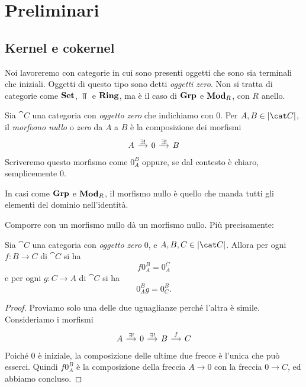 
\chapter{Preliminari}



\section{Kernel e cokernel}

Noi lavoreremo con categorie in cui sono presenti oggetti che sono sia
terminali che iniziali. Oggetti di questo tipo sono detti {\em oggetti
  zero}. Non si tratta di categorie come \(\mathbf{Set}\), \(\Top\) e \(\mathbf{Ring}\),
ma è il caso di \(\mathbf{Grp}\) e \(\mathbf{Mod}_R\), con \(R\) anello.

\begin{definition}
  Sia \(\cat C\) una categoria con {\em oggetto zero} che indichiamo con
  \(0\). Per \(A, B \in \obj{\cat C}\), il {\em morfismo nullo} o {\em
    zero} da \(A\) a \(B\) è la composizione dei morfismi
  \[
    \begin{tikzcd}[column sep=small]
      A \ar["{\exists!}", r] & 0 \ar["{\exists!}", r] & B
    \end{tikzcd}
  \]
  Scriveremo questo morfismo come \(0_A^B\) oppure, se dal contesto è
  chiaro, semplicemente \(0\).
\end{definition}

\begin{example}
  In casi come \(\mathbf{Grp}\) e \(\mathbf{Mod}_R\), il morfismo nullo è quello che
  manda tutti gli elementi del dominio nell'identità. %
\end{example}

Comporre con un morfismo nullo dà un morfismo nullo. Più precisamente:

\begin{proposition}\label{lemma:CompCon0}
  Sia \(\cat C\) una categoria con {\em oggetto zero} \(0\), e
  \(A, B, C \in \obj{\cat C}\). Allora per ogni \(f : B \to C\) di
  \(\cat C\) si ha
  \[
    f 0_A^B = 0_A^C
  \]
  e per ogni \(g : C \to A\) di \(\cat C\) si ha
  \[
    0_A^B g = 0_C^B .
  \]
\end{proposition}

\begin{proof}
  Proviamo solo una delle due uguaglianze perché l'altra è
  simile. Consideriamo i morfismi
  \[
    \begin{tikzcd}[column sep=small]
      A \ar["{\exists!}", r] & 0 \ar["{\exists!}", r] & B \ar["f", r] & C
    \end{tikzcd}
  \]
  Poiché \(0\) è iniziale, la composizione delle ultime due frecce è
  l'unica che può esserci. Quindi \(f 0_A^B\) è la composizione della
  freccia \(A \to 0\) con la freccia \(0 \to C\), ed abbiamo concluso.
\end{proof}


